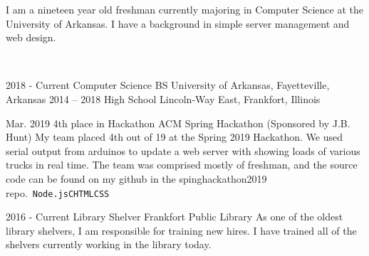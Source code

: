 \documentclass[9pt]{developercv} %
\begin{document}
	\begin{minipage}[t]{0.45\textwidth}
		\vspace{-\baselineskip} %

		I am a nineteen year old freshman currently majoring in Computer Science at the University of Arkansas. I have a background in simple server management and web design.

	\end{minipage}
	\hfill %
	\begin{minipage}[t]{0.5\textwidth} %
		\vspace{-\baselineskip} %
		\vspace{.2cm}\\
		
	\end{minipage}

\vspace{0.5cm}



\begin{entrylist}
	\entry
		{2018 - Current}
		{Computer Science BS}
		{}
		{University of Arkansas, Fayetteville, Arkansas}
	\entry
		{2014 -- 2018}
		{High School}
		{}
		{Lincoln-Way East, Frankfort, Illinois}
\end{entrylist}


\begin{entrylist}
	\entry
		{Mar. 2019}
		{4th place in Hackathon}
		{ACM Spring Hackathon (Sponsored by J.B. Hunt)}
		{My team placed 4th out of 19 at the Spring 2019 Hackathon. We used serial output from arduinos to update a web server with showing loads of various trucks in real time. The team was comprised mostly of freshman, and the source code can be found on my github in the spinghackathon2019 repo.\
		\newline\texttt{Node.js}\slashsep\texttt{C}\slashsep\texttt{HTML}\slashsep\texttt{CSS}}
\end{entrylist}

\begin{entrylist}
	\entry
		{2016 - Current}
		{Library Shelver}
		{Frankfort Public Library}
		{As one of the oldest library shelvers, I am responsible for training new hires. I have trained all of the shelvers currently working in the library today.}\
\end{entrylist}
\end{document}
